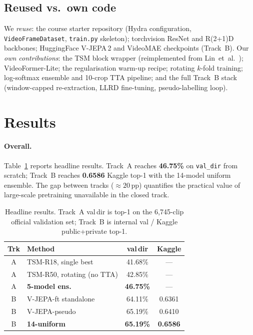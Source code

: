 \documentclass[10pt,twocolumn,letterpaper]{article}
\begin{document}
\subsection{Reused vs.\ own code}
We \emph{reuse}: the course starter repository (Hydra configuration,
\texttt{VideoFrameDataset}, \texttt{train.py} skeleton); torchvision ResNet
and R(2+1)D backbones; HuggingFace V-JEPA\,2 and VideoMAE checkpoints (Track~B).
Our \emph{own contributions}: the TSM block wrapper (reimplemented from Lin~et~al.~\cite{lin2019tsm});
VideoFormer-Lite; the regularisation warm-up recipe; rotating $k$-fold training;
log-softmax ensemble and 10-crop TTA pipeline; and the full Track~B stack
(window-capped re-extraction, LLRD fine-tuning, pseudo-labelling loop).

\section{Results}
\label{sec:results}

\paragraph{Overall.}
Table~\ref{tab:summary} reports headline results. Track~A reaches
\textbf{46.75\%} on \texttt{val\_dir} from scratch; Track~B reaches
\textbf{0.6586} Kaggle top-1 with the 14-model uniform ensemble.
The gap between tracks (${\approx}20$\,pp) quantifies the practical value of
large-scale pretraining unavailable in the closed track.

\begin{table}[t]
\centering\small
\setlength{\tabcolsep}{5pt}
\begin{tabular}{@{}clcc@{}}
\toprule
Trk & Method & val\,dir & Kaggle \\
\midrule
A & TSM-R18, single best      & 41.68\%  & --- \\
A & TSM-R50, rotating (no TTA) & 42.85\%  & --- \\
A & \textbf{5-model ens.}       & \textbf{46.75\%} & --- \\
\midrule
B & V-JEPA-ft standalone       & 64.11\%  & 0.6361 \\
B & V-JEPA-pseudo              & 65.19\%  & 0.6410 \\
B & \textbf{14-uniform}         & \textbf{65.19\%} & \textbf{0.6586} \\
\bottomrule
\end{tabular}
\caption{Headline results. Track~A val\,dir is top-1 on the 6,745-clip
official validation set; Track~B is internal val / Kaggle public+private top-1.}
\label{tab:summary}
\end{table}
\end{document}

